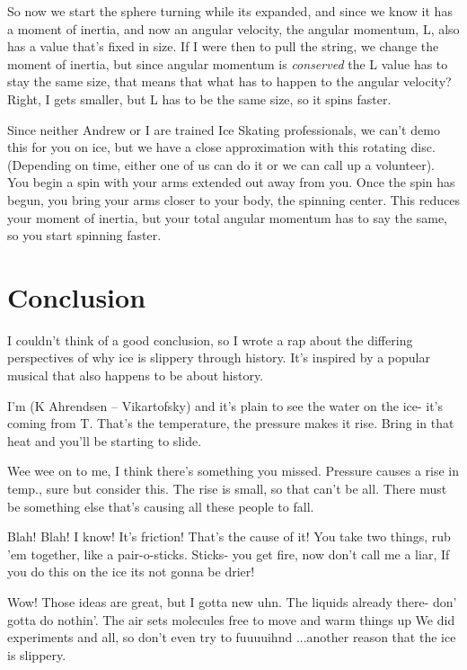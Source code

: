 \documentclass[12pt]{article}
\begin{document}
So now we start the sphere turning while its expanded, and since we know it has a moment of 
inertia, and now an angular velocity, the angular momentum, L, also has a value that's 
fixed in size. If I were then to pull the string, we change the moment of inertia, but since 
angular momentum is \emph{conserved} the L value has to stay the same size, that means that
what has to happen to the angular velocity? Right, I gets smaller, but L has to be the same
size, so it spins faster.

Since neither Andrew or I are trained Ice Skating professionals, we can't demo this for you 
on ice, but we have a close approximation with this rotating disc. (Depending on time, 
either one of us can do it or we can call up a volunteer). You begin a spin with your arms
extended out away from you. Once the spin has begun, you bring your arms closer 
to your body, the spinning center. This reduces your moment of inertia, but your total
angular momentum has to say the same, so you start spinning faster.

\section{Conclusion}
I couldn't think of a good conclusion, so I wrote a rap
about the differing perspectives of why ice is slippery 
through history. It's inspired by a popular musical that
also happens to be about history.

I'm (K Ahrendsen -- Vikartofsky) and it's plain to see 
the water on the ice- it's coming from T.
That's the temperature, the pressure makes it rise. 
Bring in that heat and you'll be starting to slide. 

Wee wee on to me, I think there's something you missed.
Pressure causes a rise in temp., sure but consider this.
The rise is small, so that can't be all. 
There must be something else that's causing all these people to fall. 

Blah! Blah! I know! It's friction! That's the cause of it!
You take two things, rub 'em together, like a pair-o-sticks.
Sticks- you get fire, now don't call me a liar,
If you do this on the ice its not gonna be drier!

Wow! Those ideas are great, but I gotta new uhn.
The liquids already there- don' gotta do nothin'.
The air sets molecules free to move and warm things up
We did experiments and all, so don't even try to fuuuuihnd
...another reason that the ice is slippery.
\end{document}
